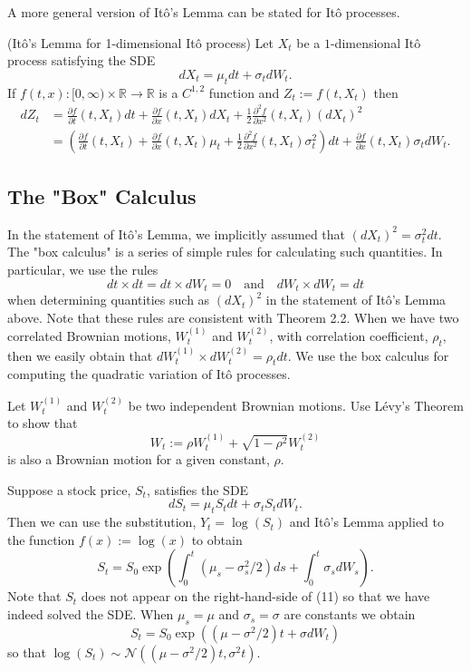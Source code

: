 A more general version of It\^o's Lemma can be stated for It\^o processes.

\begin{theorem} (It\^o's Lemma for 1-dimensional It\^o process)
Let $X_t$ be a $1$-dimensional It\^o process satisfying the SDE
\[dX_t = \mu_t dt + \sigma_t dW_t.\]
If $f(t,x):[0,\infty)\times \mathbb{R}\to \mathbb{R}$ is a $C^{1,2}$ function and $Z_t:=f(t,X_t)$ then
\begin{align*}
dZ_t &= \frac{\partial f}{\partial t}(t,X_t) dt + \frac{\partial f}{\partial x}(t,X_t) dX_t + \frac{1}{2}\frac{\partial^2 f}{\partial x^2}(t,X_t) (dX_t)^2 \\
&= \left(\frac{\partial f}{\partial t}(t,X_t) + \frac{\partial f}{\partial x}(t,X_t) \mu_t + \frac{1}{2}\frac{\partial^2 f}{\partial x^2}(t,X_t) \sigma_t^2\right) dt + \frac{\partial f}{\partial x}(t,X_t) \sigma_t dW_t.
\end{align*}
\end{theorem}

\subsection{The "Box" Calculus}
In the statement of It\^o's Lemma, we implicitly assumed that $(dX_t)^2=\sigma_t^2 dt$. The "box calculus" is a series of simple rules for calculating such quantities. In particular, we use the rules
\[dt\times dt = dt\times dW_t = 0 \quad \text{and} \quad dW_t\times dW_t = dt\]
when determining quantities such as $(dX_t)^2$ in the statement of It\^o's Lemma above. Note that these rules are consistent with Theorem 2.2. When we have two correlated Brownian motions, $W^{(1)}_t$ and $W^{(2)}_t$, with correlation coefficient, $\rho_t$, then we easily obtain that $dW^{(1)}_t\times dW^{(2)}_t=\rho_t dt$. We use the box calculus for computing the quadratic variation of It\^o processes.

\begin{example}
Let $W^{(1)}_t$ and $W^{(2)}_t$ be two independent Brownian motions. Use L\'evy's Theorem to show that
\[W_t := \rho W^{(1)}_t + \sqrt{1-\rho^2} W^{(2)}_t\]
is also a Brownian motion for a given constant, $\rho$.
\end{example}

\begin{example}
Suppose a stock price, $S_t$, satisfies the SDE
\[dS_t = \mu_t S_t dt + \sigma_t S_t dW_t.\]
Then we can use the substitution, $Y_t=\log(S_t)$ and It\^o's Lemma applied to the function $f(x):=\log(x)$ to obtain
\[S_t = S_0 \exp\left(\int_0^t (\mu_s-\sigma_s^2/2) ds + \int_0^t \sigma_s dW_s\right). \tag{11}\]
Note that $S_t$ does not appear on the right-hand-side of (11) so that we have indeed solved the SDE. When $\mu_s=\mu$ and $\sigma_s=\sigma$ are constants we obtain
\[S_t = S_0 \exp\left((\mu-\sigma^2/2) t + \sigma dW_t\right) \tag{12}\]
so that $\log(S_t)\sim \mathcal{N}\left((\mu-\sigma^2/2)t, \sigma^2 t\right)$.
\end{example}

